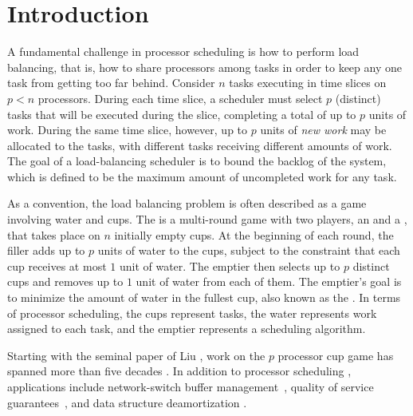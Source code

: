 \section{Introduction}\label{sec:intro}

A fundamental challenge in processor scheduling is how to perform
load balancing, that is, how to share processors among tasks in
order to keep any one task from getting too far behind. Consider
$n$ tasks executing in time slices on $p < n$ processors. During
each time slice, a scheduler must select $p$ (distinct) tasks
that will be executed during the slice, completing a total of up
to $p$ units of work. During the same time slice, however, up to
$p$ units of \emph{new work} may be allocated to the tasks, with
different tasks receiving different amounts of work. The goal of
a load-balancing scheduler is to bound the backlog of the system,
which is defined to be the maximum amount of uncompleted work for
any task.

As a convention, the load balancing problem is often described as
a game involving water and cups. The  is a multi-round game with two players, an 
and a , that takes place on $n$ initially empty
cups. At the beginning of each round, the filler adds up to $p$
units of water to the cups, subject to the constraint that each
cup receives at most $1$ unit of water. The emptier then selects
up to $p$ distinct cups and removes up to $1$ unit of water from
each of them. The emptier's goal is to minimize the amount of
water in the fullest cup, also known as the . In
terms of processor scheduling, the cups represent tasks, the
water represents work assigned to each task, and the emptier
represents a scheduling algorithm.

Starting with the seminal paper of Liu \cite{Liu69}, work on the $p$ processor cup game has spanned more than five decades \cite{BaruahCoPl96,GkasieniecKl17,BaruahGe95,LitmanMo11,LitmanMo05,MoirRa99,BarNi02,GuanYi12,Liu69, LiuLa73,DietzRa91, BenderFaKu19, Kuszmaul20, AdlerBeFr03, DietzSl87, LitmanMo09}. In addition to processor scheduling \cite{BaruahCoPl96,GkasieniecKl17,BaruahGe95,LitmanMo11,LitmanMo05,MoirRa99,BarNi02,GuanYi12,Liu69, LiuLa73, AdlerBeFr03, LitmanMo09, DietzRa91}, applications include network-switch buffer management~\cite{Goldwasser10,AzarLi06,RosenblumGoTa04,Gail93}, quality of service guarantees~\cite{BaruahCoPl96,AdlerBeFr03,LitmanMo09}, and data structure deamortization \cite{AmirFaId95,DietzRa91,DietzSl87,AmirFr14,Mortensen03,GoodrichPa13,FischerGa15,Kopelowitz12,BenderDaFa20}.


